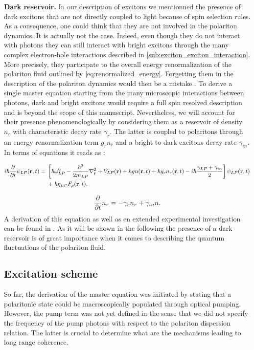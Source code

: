 \textbf{Dark reservoir. }In our description of excitons we mentionned the presence of dark excitons that are not directly coupled to light because of spin selection rules. As a consequence, one could think 
that they are not involved in the polariton dynamics. It is actually not the case. Indeed, even though they do not interact with photons they can still interact with bright excitons through the many complex electron-hole interactions described in \autoref{sub:exciton_exciton_interaction}. More precisely, they participate to the overall energy renormalization of the polariton fluid outlined by \autoref{eq:renormalized_energy}.
Forgetting them in the description of the polariton dynamics would then be a mistake \cite{Menard2014, stepanov_dispersion_2019}. To derive a single master equation starting from the many microscopic interactions between photons, dark and bright excitons would require a full spin resolved description and is beyond the scope of this manuscript.
Nevertheless, we will account for their presence phenomenologically by considering them as a reservoir of density $n_r$ with characteristic decay rate $\gamma_r$. The latter is coupled to polaritons through an energy renormalization term $g_rn_r$ and a bright to dark excitons decay rate $\gamma_{in}$. In terms of equations it reads as :


\begin{align}
    \begin{split}
        i \hbar \dfrac{\partial}{\partial t} \psi_{LP}(\mathbf{r}, t) ={}& \left[ \hbar \omega_{LP}^0 -\dfrac{\hbar^2}{2 m_{LP}}\nabla_{\mathbf{r}}^2 + V_{LP}(\mathbf{r}) + \hbar g n(\mathbf{r}, t) + \hbar g_r n_r(\mathbf{r}, t) - i \hbar \dfrac{\gamma_{LP} + \gamma_{in}}{2} \right] \psi_{LP}(\mathbf{r}, t)  \\&+ \hbar \eta_{LP} F_p(\mathbf{r}, t),
    \end{split}
    \end{align}
    
    \begin{equation}
         \dfrac{\partial}{\partial t} n_r = -\gamma_r n_r + \gamma_{in} n.
         \label{reservoir_eq}
    \end{equation}
A derivation of this equation as well as en extended experimental investigation can be found in \cite{stepanov_dispersion_2019}.
As it will be shown in the following the presence of a dark reservoir is of great importance when it comes to describing the quantum fluctuations of the polariton fluid.


\subsection{Excitation scheme} So far, the derivation of the master equation was initiated by stating that a polaritonic state could be macroscopically populated 
through optical pumping. However, the pump term was not yet defined in the sense that we did not specify the frequency of the pump photons with respect to the polariton dispersion relation.
The latter is crucial to determine what are the mechanisms leading to long range coherence. 

